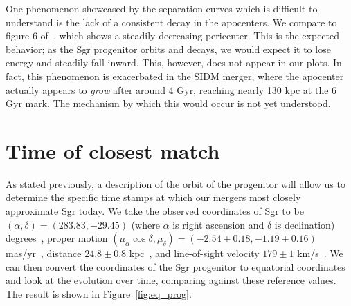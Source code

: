 One phenomenon showcased by the separation curves which is difficult to
understand is the lack of a consistent decay in the apocenters. We compare to
figure 6 of~\cite{dierickx_predicted_2017}, which shows a steadily decreasing
pericenter.  This is the expected behavior; as the Sgr progenitor orbits and
decays, we would expect it to lose energy and steadily fall inward.  This,
however, does not appear in our plots.  In fact, this phenomenon is
exacerbated in the SIDM merger, where the apocenter actually appears to
\textit{grow} after around 4 Gyr, reaching nearly 130 kpc at the 6 Gyr mark.
The mechanism by which this would occur is not yet understood.

\hypertarget{time-of-closest-match}{%
\section{Time of closest match}\label{time-of-closest-match}}

As stated previously, a description of the orbit of the progenitor will allow us
to determine the specific time stamps at which our mergers most closely
approximate Sgr today.  We take the observed coordinates of Sgr to be
$(\alpha, \delta) = (283.83, -29.45)$ (where $\alpha$ is right ascension and
$\delta$ is declination) degrees~\cite{nasa_nasaipac_nodate}, proper motion
$(\mu_\alpha \cos\delta, \mu_\delta) = (-2.54 \pm 0.18, -1.19 \pm 0.16)$
mas/yr~\cite{massari_hubble_2013}, distance $24.8 \pm 0.8$
kpc~\cite{kunder_distance_2009}, and line-of-sight velocity $179 \pm 1$
km/s~\cite{dierickx_predicted_2017,bellazzini_nucleus_2008}. We can then convert
the coordinates of the Sgr progenitor to equatorial coordinates and look at the
evolution over time, comparing against these reference values. The result is
shown in Figure~\ref{fig:eq_prog}.

